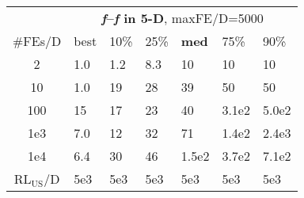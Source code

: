 \begin{tabular}{c|llllll}
 & \multicolumn{6}{|c}{\textbf{\textit{f}\raisebox{-0.35ex}{1}--\textit{f}\raisebox{-0.35ex}{24} in 5-D}, maxFE/D=5000}\\
\#FEs/D & best & 10\% & 25\% & \textbf{med} & 75\% & 90\%\\
2 & \hspace*{1ex}1.0 & \hspace*{1ex}1.2 & \hspace*{1ex}8.3 & 10 & 10 & 10\\
10 & \hspace*{1ex}1.0 & 19 & 28 & 39 & 50 & 50\\
100 & 15 & 17 & 23 & 40 & 3.1e2 & 5.0e2\\
1e3 & \hspace*{1ex}7.0 & 12 & 32 & 71 & 1.4e2 & 2.4e3\\
1e4 & \hspace*{1ex}6.4 & 30 & 46 & 1.5e2 & 3.7e2 & 7.1e2\\
$\text{RL}_{\text{US}}$/D & 5e3 & 5e3 & 5e3 & 5e3 & 5e3 & 5e3
\end{tabular}
